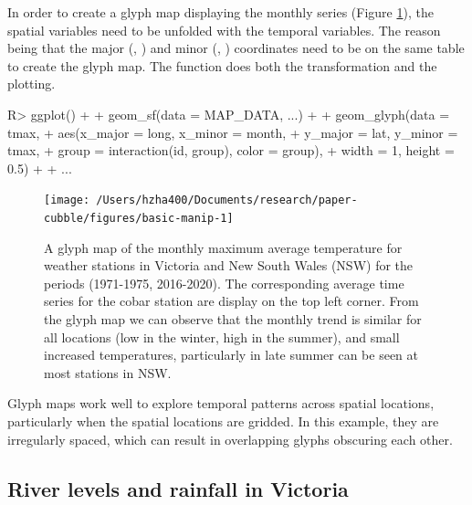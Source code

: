 \documentclass[
  shortnames]{jss}
\begin{document}
In order to create a glyph map displaying the monthly series (Figure \ref{fig:basic-manip}), the spatial variables need to be unfolded with the temporal variables. The reason being that the major (, ) and minor (, ) coordinates need to be on the same table to create the glyph map. The  function does both the transformation and the plotting.

\begin{CodeChunk}
\begin{CodeInput}
R> ggplot() +
+   geom_sf(data = MAP_DATA, ...) +
+   geom_glyph(data = tmax,
+              aes(x_major = long, x_minor = month,
+                  y_major = lat, y_minor = tmax,
+                  group = interaction(id, group), color = group),
+              width = 1, height = 0.5) + 
+   ...
\end{CodeInput}
\end{CodeChunk}

\begin{CodeChunk}
\begin{figure}

{\centering \texttt{[image: /Users/hzha400/Documents/research/paper-cubble/figures/basic-manip-1]} 

}

\caption[A glyph map of the monthly maximum average temperature for weather stations in  Victoria and New South Wales (NSW) for the periods (1971-1975, 2016-2020)]{A glyph map of the monthly maximum average temperature for weather stations in  Victoria and New South Wales (NSW) for the periods (1971-1975, 2016-2020). The corresponding average time series for the cobar station are display on the top left corner. From the glyph map we can observe that the monthly trend is similar for all locations (low in the winter, high in the summer), and small increased temperatures, particularly in late summer can be seen at most stations in NSW.}\label{fig:basic-manip}
\end{figure}
\end{CodeChunk}

Glyph maps work well to explore temporal patterns across spatial locations, particularly when the spatial locations are gridded. In this example, they are irregularly spaced, which can result in overlapping glyphs obscuring each other.

\hypertarget{river-levels-and-rainfall-in-victoria}{%
\subsection{River levels and rainfall in Victoria}\label{river-levels-and-rainfall-in-victoria}}
\end{document}

